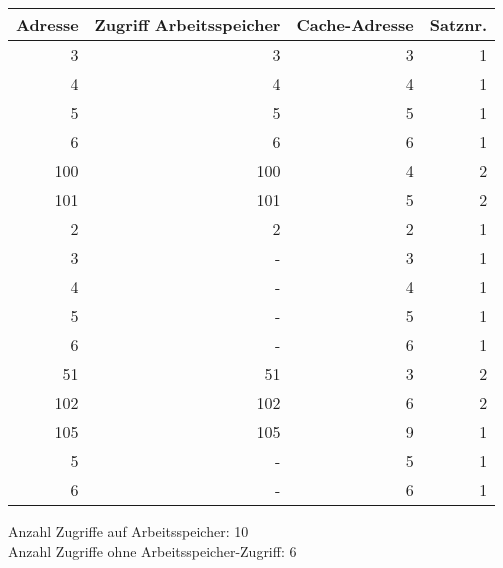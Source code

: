 \documentclass[10pt]{article}
\begin{document}
\begin{enumerate}[label=\alph*)]
		\begin{tabular}{r | r | r | r}
		Adresse & Zugriff Arbeitsspeicher & Cache-Adresse & Satznr.\\
		\hline
		3	& 	3 	& 3 	& 1\\
		4	&	4 	& 4 	& 1\\
		5	&	5 	& 5 	& 1\\
		6	&	6 	& 6 	& 1\\
		100	&	100 & 4 	& 2\\
		101	&	101	& 5 	& 2\\
		2	&	2	& 2 	& 1\\
		3	&	-	& 3 	& 1\\
		4	&	-	& 4 	& 1\\ %
		5	&	-	& 5 	& 1\\
		6	&	-	& 6 	& 1\\
		51	&	51	& 3 	& 2\\
		102 &	102 & 6 	& 2\\
		105 &	105 & 9	& 1\\  %
		5	&	-	& 5 	& 1\\
		6	&	-	& 6 	& 1\\
		\end{tabular}
		Anzahl Zugriffe auf Arbeitsspeicher: 10 \\
		Anzahl Zugriffe ohne Arbeitsspeicher-Zugriff: 6
\end{enumerate}

\newpage
\end{document}
